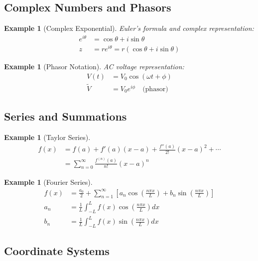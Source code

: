 \documentclass{article}
\newtheorem{example}[theorem]{Example}
\begin{document}
\subsection{Complex Numbers and Phasors}

\begin{example}[Complex Exponential]
Euler's formula and complex representation:
\begin{align*}
    e^{i\theta} &= \cos\theta + i\sin\theta \\
    z &= re^{i\theta} = r(\cos\theta + i\sin\theta)
\end{align*}
\end{example}

\begin{example}[Phasor Notation]
AC voltage representation:
\begin{align*}
    V(t) &= V_0\cos(\omega t + \phi) \\
    \tilde{V} &= V_0e^{i\phi} \quad \text{(phasor)}
\end{align*}
\end{example}

\subsection{Series and Summations}

\begin{example}[Taylor Series]
\begin{align*}
    f(x) &= f(a) + f'(a)(x-a) + \frac{f''(a)}{2!}(x-a)^2 + \cdots \\
    &= \sum_{n=0}^{\infty} \frac{f^{(n)}(a)}{n!}(x-a)^n
\end{align*}
\end{example}

\begin{example}[Fourier Series]
\begin{align*}
    f(x) &= \frac{a_0}{2} + \sum_{n=1}^{\infty} \left[a_n\cos\left(\frac{n\pi x}{L}\right) + b_n\sin\left(\frac{n\pi x}{L}\right)\right] \\
    a_n &= \frac{1}{L}\int_{-L}^L f(x)\cos\left(\frac{n\pi x}{L}\right)dx \\
    b_n &= \frac{1}{L}\int_{-L}^L f(x)\sin\left(\frac{n\pi x}{L}\right)dx
\end{align*}
\end{example}

\subsection{Coordinate Systems}
\end{document}

